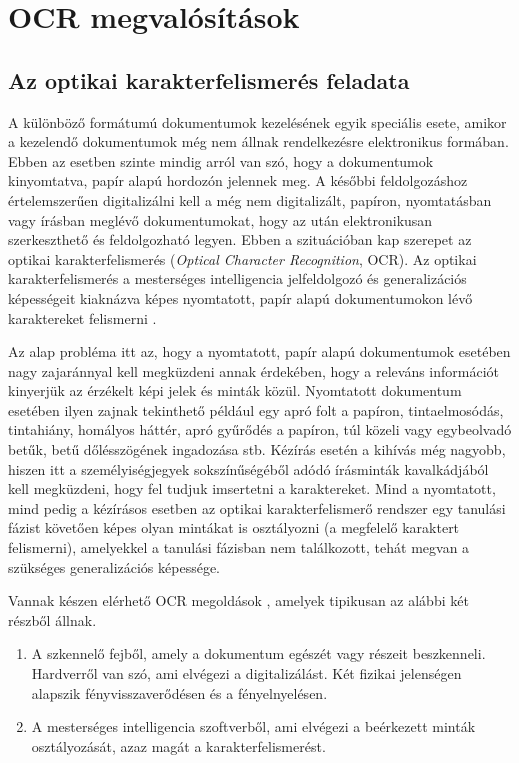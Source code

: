 \section{OCR megvalósítások}


\subsection{Az optikai karakterfelismerés feladata}

A különböző formátumú dokumentumok kezelésének egyik speciális esete, amikor a kezelendő dokumentumok még nem állnak rendelkezésre elektronikus formában. Ebben az esetben szinte mindig arról van szó, hogy a dokumentumok kinyomtatva, papír alapú hordozón jelennek meg. A későbbi feldolgozáshoz értelemszerűen digitalizálni kell a még nem digitalizált, papíron, nyomtatásban vagy írásban meglévő dokumentumokat, hogy az után elektronikusan szerkeszthető és feldolgozható legyen. Ebben a szituációban kap szerepet az optikai karakterfelismerés (\textit{Optical Character Recognition}, OCR). Az optikai karakterfelismerés a mesterséges intelligencia jelfeldolgozó és generalizációs képességeit kiaknázva képes nyomtatott, papír alapú dokumentumokon lévő karaktereket felismerni \cite{liu2013online}.

Az alap probléma itt az, hogy a nyomtatott, papír alapú dokumentumok esetében nagy zajaránnyal kell megküzdeni annak érdekében, hogy a releváns információt kinyerjük az érzékelt képi jelek és minták közül. Nyomtatott dokumentum esetében ilyen zajnak tekinthető például egy apró folt a papíron, tintaelmosódás, tintahiány, homályos háttér, apró gyűrődés a papíron, túl közeli vagy egybeolvadó betűk, betű dőlésszögének ingadozása stb. Kézírás esetén a kihívás még nagyobb, hiszen itt a személyiségjegyek sokszínűségéből adódó írásminták kavalkádjából kell megküzdeni, hogy fel tudjuk imsertetni a karaktereket. Mind a nyomtatott, mind pedig a kézírásos esetben az optikai karakterfelismerő rendszer egy tanulási fázist követően képes olyan mintákat is osztályozni (a megfelelő karaktert felismerni), amelyekkel a tanulási fázisban nem találkozott, tehát megvan a szükséges generalizációs képessége.

Vannak készen elérhető OCR megoldások \cite{tmwebdvi77}, amelyek tipikusan az alábbi két részből állnak.
\begin{enumerate}
\item A szkennelő fejből, amely a dokumentum egészét vagy részeit beszkenneli. Hardverről van szó, ami elvégezi a digitalizálást. Két fizikai jelenségen alapszik fényvisszaverődésen és a fényelnyelésen.
\item  A mesterséges intelligencia szoftverből, ami elvégezi a beérkezett minták osztályozását, azaz magát a karakterfelismerést.
\end{enumerate}

